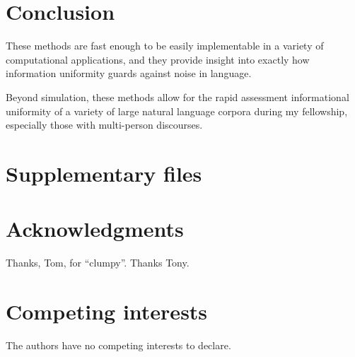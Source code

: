 \documentclass[12pt]{article}
\begin{document}
\section{Conclusion}

These methods are fast enough to be easily implementable in a variety of computational applications, and they provide insight into exactly how information uniformity guards against noise in language.

Beyond simulation, these methods allow for the rapid assessment informational uniformity of a variety of large natural language corpora during my fellowship, especially those with multi-person discourses.

\section*{Supplementary files}

\section*{Acknowledgments}

Thanks, Tom, for ``clumpy''. Thanks Tony.

\section*{Competing interests}

The authors have no competing interests to declare.




\end{document}
